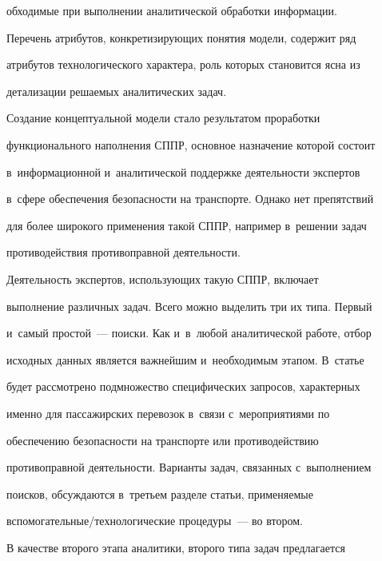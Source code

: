 \pagebreak





\noindent


обходимые при выполнении аналитической обработки информации. 


Перечень атрибутов, конкретизирующих понятия модели, содержит ряд 


атрибутов технологического характера, роль которых становится ясна из 


детализации решаемых аналитических задач.


      


      Создание концептуальной модели стало результатом проработки 


функционального наполнения СППР, основное назначение которой состоит 


в~информационной и~аналитической поддержке деятельности экспертов 


в~сфере обеспечения безопасности на транспорте. Однако нет препятствий 


для более широкого применения такой СППР, например в~решении задач 


противодействия противоправной деятельности.


      


      Деятельность экспертов, использующих такую СППР, включает 


выполнение различных задач. Всего можно выделить три их типа. Первый 


и~самый простой~--- поиски. Как и~в~любой аналитической работе, отбор 


исходных данных является важнейшим и~необходимым этапом. В~статье 


будет рассмотрено подмножество специфических запросов, характерных 


именно для пассажирских перевозок в~связи с~мероприятиями по 


обеспечению безопасности на транспорте или противодействию 


противоправной деятельности. Варианты задач, связанных с~выполнением 


поисков, обсуждаются в~третьем разделе статьи, применяемые  


вспо\-мо\-га\-тель\-ные\!/\!тех\-но\-ло\-ги\-че\-ские процедуры~--- во втором.


      


      В качестве второго этапа аналитики, второго типа задач предлагается 


